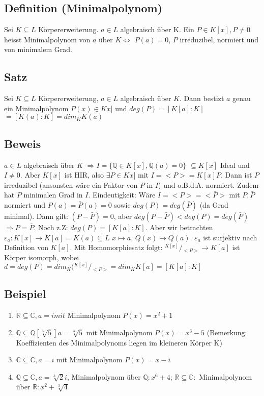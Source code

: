 \documentclass[12pt,a4paper,ngerman]{scrreprt}
\newcommand{\modulus}[2]{{}^{#1} \!/\!_{#2}}
\begin{document}
\subsection{Definition (Minimalpolynom)}
Sei $K \subseteq L$ Körpererweiterung. $a \in L$ algebraisch über K.
Ein $P \in K[x], P \neq 0$ heisst Minimalpolynom von $a$ über $K \Leftrightarrow$
$P(a) = 0$, $P$ irreduzibel, normiert und von minimalem Grad.

\subsection{Satz}
Sei $K \subseteq L$ Körpererweiterung, $a \in L$ algebraisch über $K$.
Dann bestizt $a$ genau ein Minimalpolynom $P(x) \in Kx]$ und $deg(P) = [K[a]:K]$
$= [K(a):K] = dim_K K(a)$

\subsection{Beweis}
$a \in L$ algebraisch über $K$ $\Rightarrow I = \{ \mathbb{Q} \in K[x], \mathbb{Q}(a) = 0\}$
$\subseteq K[x]$ Ideal und $I \neq 0$.
Aber $K[x]$ ist HIR, also $\exists P \in Kx]$ mit $I = <P> = K[x]P$.
Dann ist $P$ irreduzibel (ansonsten wäre ein Faktor von $P$ in $I$) und o.B.d.A. normiert.
Zudem hat $P$ minimalen Grad in $I$. 
Eindeutigkeit: Wäre $I = <P> = <\bar{P}>$ mit $P,\bar{P}$ normiert und $P(a)=\bar{P}(a)=0$
sowie $deg(P) = deg(\bar{P})$ (da Grad minimal).
Dann gilt: $(P-\bar{P}) = 0$, aber $deg(P-\bar{P}) < deg(P) = deg(\bar{P})$
$\Rightarrow P = \bar{P}$. Noch z.Z: $deg(P) = [K[a]:K]$. 
Aber wir betrachten $\varepsilon_a: K[x] \to K[a] = K(a) \subseteq L$
$x \mapsto a$, $Q(x) \mapsto Q(a)$.
$\varepsilon_a$ ist surjektiv nach Definition von $K[a]$. Mit Homomorphiesatz folgt:
$\modulus{K[x]}{<P>} \to K[a]$ ist Körper isomorph, 
wobei $d = deg(P) = dim_K(\modulus{K[x]}{<P>} = dim_K K[a] = [K[a]:K]$

\subsection{Beispiel}
\begin{enumerate}[(1)]
\item $\mathbb{R} \subseteq \mathbb{C}, a = i mit$ Minimalpolynom $P(x) = x^2 +1$
\item $\mathbb{Q} \subseteq \mathbb{Q}[\sqrt[3]{5}] a = \sqrt[3]{5}$
mit Minimalpolynom $P(x) = x^3 - 5$
(Bemerkung: Koeffizienten des Minimalpolynoms liegen im kleineren Körper K)
\item $\mathbb{C} \subseteq \mathbb{C}, a=i$ mit Minimalpolynom $P(x) = x-i$
\item $\mathbb{Q} \subseteq \mathbb{C}, a = \sqrt[3]{2}i$, 
Minimalpolynom über $\mathbb{Q}: x^6 + 4$;
$\mathbb{R} \subseteq \mathbb{C}:$ Minimalpolynom über $\mathbb{R}: x^2 + \sqrt[3]{4}$
\end{enumerate}
\end{document}
